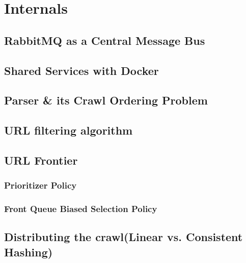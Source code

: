 \section{Internals}\label{internals}
\subsection{RabbitMQ as a Central Message Bus}
\subsection{Shared Services with Docker}
\subsection{Parser \& its Crawl Ordering Problem}
\subsection{URL filtering algorithm}
\subsection{URL Frontier}
\subsubsection{Prioritizer Policy}
\subsubsection{Front Queue Biased Selection Policy}
\subsection{Distributing the crawl(Linear vs. Consistent Hashing)}

\pagebreak